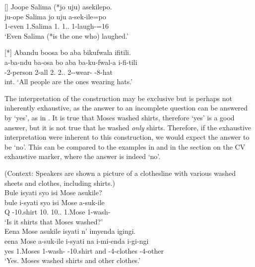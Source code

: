 \documentclass[output=paper]{langscibook}
\begin{document}
\z


\ea
[]{
\label{bkm:Ref98087453}
Joope Salima (*jo uju) asekilepo.\\
\gll
ju-ope  Salima  jo  uju  a-sek-ile=po\\
1-even  1.Salima  1.\PRO{}  1.\DEM.\PROX{}  1\SM-{}laugh-\PFV{}=16\\
\glt
‘Even Salima (*is the one who) laughed.’\\
}

\z


\ea
[*]{
\label{bkm:Ref98087461}
Abandu boosa bo aba bikufwala ifitili.\\
\gll
a-ba-ndu  ba-osa  bo  aba  ba-ku-fwal-a  i-fi-tili\\
\AUG{}-2-person  2-all  2.\PRO{}  2.\DEM.\PROX{}  2\SM-\PRS{}-wear-\FV{}  \AUG{}-8-hat\\
\glt
int. ‘All people are the ones wearing hats.’\\
}

\z


The interpretation of the construction may be exclusive but is perhaps not inherently exhaustive, as the answer to an incomplete question can be answered by ‘yes’, as in . It is true that Moses washed shirts, therefore ‘yes’ is a good answer, but it is not true that he washed \textit{only} shirts. Therefore, if the exhaustive interpretation were inherent to this construction, we would expect the answer to be ‘no’. This can be compared to the examples in  and  in the section on the CV exhaustive marker, where the answer is indeed ‘no’.

\ea
\label{bkm:Ref122709175}\label{bkm:Ref136517649}
(Context: Speakers are shown a picture of a clothesline with various washed sheets and clothes, including shirts.)\\
Bule isyati syo isi Mose asukile?\\
\gll
bule  i-syati  syo  isi  Mose  a-suk-ile\\
Q  \AUG{}-10.shirt  10.\IDCOP{}  10.\DEM{}.\PROX{}  1.Mose  1\SM{}-wash-\PFV{}\\
\glt
‘Is it shirts that Moses washed?’\\

\sn
Eena Mose asukile isyati n’ imyenda igingi.\\
\gll
eena  Mose  a-suk-ile  i-syati  na  i-mi-enda  i-gi-ngi\\
yes  1.Moses  1\SM{}-wash-\PFV{}  \AUG{}-10.shirt  and  \AUG{}-4-clothes  \AUG{}-4-other\\
\glt
‘Yes. Moses washed shirts and other clothes.’\\
\end{document}
